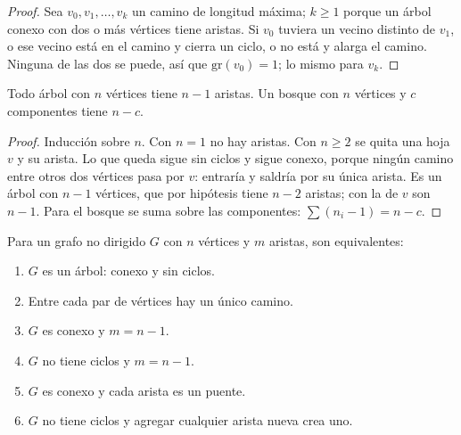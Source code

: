 \documentclass[11pt,letterpaper]{article}
\begin{document}
\begin{proof}
  Sea $v_0, v_1, \dots, v_k$ un camino de longitud máxima; $k \ge 1$
  porque un árbol conexo con dos o más vértices tiene aristas. Si
  $v_0$ tuviera un vecino distinto de $v_1$, o ese vecino está en el
  camino y cierra un ciclo, o no está y alarga el camino. Ninguna de
  las dos se puede, así que $\text{gr}(v_0) = 1$; lo mismo para
  $v_k$.
\end{proof}

\begin{lema}[Aristas]
  \label{lem:arbol-aristas}
  Todo árbol con $n$ vértices tiene $n - 1$ aristas. Un bosque con
  $n$ vértices y $c$ componentes tiene $n - c$.
\end{lema}

\begin{proof}
  Inducción sobre $n$. Con $n = 1$ no hay aristas. Con $n \ge 2$ se
  quita una hoja $v$ y su arista. Lo que queda sigue sin ciclos y
  sigue conexo, porque ningún camino entre otros dos vértices pasa
  por $v$: entraría y saldría por su única arista. Es un árbol con
  $n - 1$ vértices, que por hipótesis tiene $n - 2$ aristas; con la
  de $v$ son $n - 1$. Para el bosque se suma sobre las componentes:
  $\sum (n_i - 1) = n - c$.
\end{proof}

\begin{teorema}
  \label{teo:arbol-caracterizaciones}
  Para un grafo no dirigido $G$ con $n$ vértices y $m$ aristas, son
  equivalentes:
  \begin{enumerate}[label=(\arabic*), itemsep=0pt, parsep=0pt]
    \item $G$ es un árbol: conexo y sin ciclos.
    \item Entre cada par de vértices hay un único camino.
    \item $G$ es conexo y $m = n - 1$.
    \item $G$ no tiene ciclos y $m = n - 1$.
    \item $G$ es conexo y cada arista es un puente.
    \item $G$ no tiene ciclos y agregar cualquier arista nueva crea
          uno.
  \end{enumerate}
\end{teorema}
\end{document}
